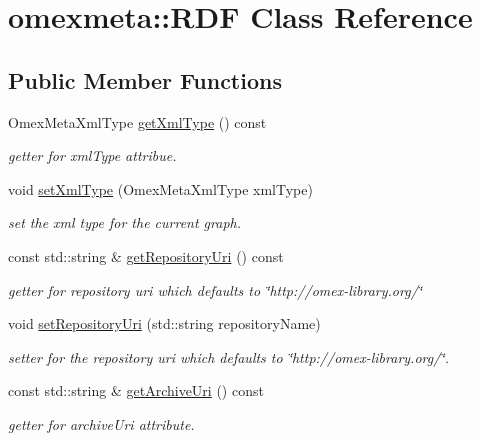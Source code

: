 \hypertarget{classomexmeta_1_1RDF}{}\section{omexmeta\+:\+:R\+DF Class Reference}
\label{classomexmeta_1_1RDF}
\subsection*{Public Member Functions}
\begin{DoxyCompactItemize}
\item 
Omex\+Meta\+Xml\+Type \hyperlink{classomexmeta_1_1RDF_a6979e6ca2688cf5cae1e9e1cf3a7309a}{get\+Xml\+Type} () const
\begin{DoxyCompactList}\small\item\em getter for xml\+Type attribue. \end{DoxyCompactList}\item 
void \hyperlink{classomexmeta_1_1RDF_a8fc7b226619580fac47afce0a7ec2628}{set\+Xml\+Type} (Omex\+Meta\+Xml\+Type xml\+Type)
\begin{DoxyCompactList}\small\item\em set the xml type for the current graph. \end{DoxyCompactList}\item 
\mbox{\label{classomexmeta_1_1RDF_a60b4a0a8c0c4f30a9cc71f9899bffabc}} 
const std\+::string \& \hyperlink{classomexmeta_1_1RDF_a60b4a0a8c0c4f30a9cc71f9899bffabc}{get\+Repository\+Uri} () const
\begin{DoxyCompactList}\small\item\em getter for repository uri which defaults to \char`\"{}http\+://omex-\/library.\+org/\char`\"{} \end{DoxyCompactList}\item 
void \hyperlink{classomexmeta_1_1RDF_a9e8669ac5cf5dbcaf235f535f7482a7a}{set\+Repository\+Uri} (std\+::string repository\+Name)
\begin{DoxyCompactList}\small\item\em setter for the repository uri which defaults to \char`\"{}http\+://omex-\/library.\+org/\char`\"{}. \end{DoxyCompactList}\item 
const std\+::string \& \hyperlink{classomexmeta_1_1RDF_a1b3bd1292e77c1d87720f854ec5a04bd}{get\+Archive\+Uri} () const
\begin{DoxyCompactList}\small\item\em getter for archive\+Uri attribute. \end{DoxyCompactList}\item 

\end{DoxyCompactItemize}
